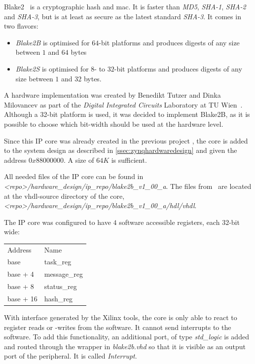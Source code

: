Blake2~\cite{blake2} is a cryptographic hash and \gls{mac}. It is faster than
\emph{MD5}, \emph{SHA-1}, \emph{SHA-2} and \emph{SHA-3}, but is at least as
secure as the latest standard \emph{SHA-3}.
It comes in two flavors:
\begin{itemize}
	\item \emph{Blake2B} is optimised for $64$-bit platforms and produces
		digests of any size between $1$ and $64$ bytes
	\item \emph{Blake2S} is optimised for $8$- to $32$-bit platforms and
		produces digests of any size between $1$ and $32$ bytes.
\end{itemize}

A hardware implementation was created by Benedikt Tutzer and Dinka Milovancev as
part of the \emph{Digital Integrated Circuits} Laboratory at TU
Wien~\cite{blake2hardware}.
Although a 32-bit platform is used, it was decided to implement Blake2B, as it is possible to choose which bit-width should be used at the hardware level.

Since this IP core was already created in the previous project \cite{oldrepo}, the core is added to the system design as described in
\cref{ssec:zynqhardwaredesign} and given the address $0x88000000$. A size of
$64K$ is sufficient.

All needed files of the IP core can be found in \emph{<repo>/hardware\_design/ip_repo/blake2b\_v1\_00\_a}.
The files from~\cite{blake2hardware} are located at the vhdl-source directory
of the core,\\
\emph{<repo>/hardware\_design/ip_repo/blake2b\_v1\_00\_a/hdl/vhdl}.

The IP core was configured to have $4$ software accessible registers, each $32$-bit wide:

\begin{tabular}{ll}
	Address & Name \\
	base     & task\_reg\\
	base + 4 & message\_reg\\
	base + 8 & status\_reg\\
	base + 16 & hash\_reg\\
\end{tabular}
\medbreak

With interface generated by the Xilinx tools, the core is only able to react to
register reads or -writes from the software.
It cannot send interrupts to the software.
To add this functionality, an additional port, of type \emph{std\_logic} is
added and routed through the wrapper in \emph{blake2b.vhd} so that it is
visible as an output port of the peripheral.
It is called \emph{Interrupt}.

